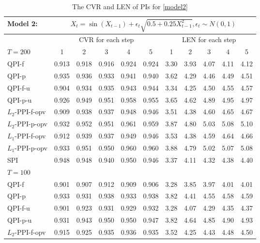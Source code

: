 \documentclass[a4paper]{article}
\begin{document}
\begin{table}[htbp]
\centering
  \caption{The CVR and LEN of PIs for \cref{model2}}
  \vspace{2pt}
  \label{Tab:model2}
\begin{tabular}{lcccccccccc}
  \toprule 
 Model 2: & \multicolumn{10}{c}{$X_t = \sin(X_{t-1}) + \epsilon_t\sqrt{0.5 + 0.25X_{t-1}^2}, \epsilon_t\sim N(0,1)$} \\
 \midrule
  & \multicolumn{5}{c}{CVR for each step} & \multicolumn{5}{c}{LEN for each step}\\
    $T = 200$  & 1     & 2     & 3     & 4     & 5 & 1 & 2 & 3 & 4 & 5  \\[3pt]
 QPI-f & 0.913 & 0.918 & 0.916 & 0.924 & 0.924 & 3.30 & 3.93 & 4.07 & 4.11 & 4.12 \\ 
  QPI-p & 0.935 & 0.936 & 0.933 & 0.941 & 0.940 & 3.62 & 4.29 & 4.46 & 4.49 & 4.51  \\ 
  QPI-f-u & 0.904 & 0.934 & 0.935 & 0.943 & 0.944 & 3.34 & 4.25 & 4.50 & 4.55 & 4.57 \\ 
  QPI-p-u & 0.926 & 0.949 & 0.951 & 0.958 & 0.955 & 3.65 & 4.62 & 4.89 & 4.95 & 4.97  \\ 
  $L_2$-PPI-f-opv & 0.909 & 0.938 & 0.937 & 0.948 & 0.946 & 3.51 & 4.38 & 4.60 & 4.65 & 4.67 \\ 
  $L_2$-PPI-p-opv & 0.932 & 0.952 & 0.951 & 0.961 & 0.959 & 3.87 & 4.80 & 5.03 & 5.08 & 5.10 \\ 
  $L_1$-PPI-f-opv & 0.912 & 0.939 & 0.937 & 0.949 & 0.946 & 3.53 & 4.38 & 4.59 & 4.64 & 4.66 \\ 
  $L_1$-PPI-p-opv & 0.933 & 0.951 & 0.950 & 0.960 & 0.960 & 3.88 & 4.79 & 5.02 & 5.07 & 5.08\\ 
  SPI & 0.948 & 0.948 & 0.940 & 0.950 & 0.946 & 3.37 & 4.11 & 4.32 & 4.38 & 4.40 \\ [3pt]
    $T = 100$        &       &       &       &       &  \\[3pt]
  QPI-f & 0.901 & 0.907 & 0.912 & 0.909 & 0.906 &  3.28 & 3.85 & 3.97 & 4.01 & 4.01 \\ 
  QPI-p & 0.933 & 0.931 & 0.938 & 0.933 & 0.938 & 3.82 & 4.41 & 4.55 & 4.58 & 4.59   \\ 
  QPI-f-u & 0.901 & 0.923 & 0.931 & 0.929 & 0.932 & 3.28 & 4.07 & 4.29 & 4.35 & 4.37 \\ 
  QPI-p-u & 0.931 & 0.943 & 0.950 & 0.950 & 0.947 & 3.82 & 4.64 & 4.85 & 4.90 & 4.93  \\ 
  $L_2$-PPI-f-opv  & 0.915 & 0.925 & 0.935 & 0.936 & 0.935 & 3.52 & 4.25 & 4.43 & 4.48 & 4.50  \\ 

\end{tabular}
\end{table}
\end{document}
